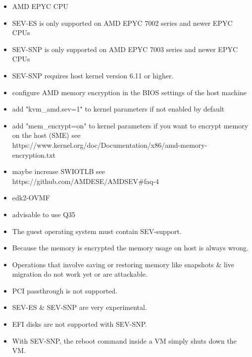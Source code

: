 \begin{itemize}[leftmargin=2cm]

	\item AMD EPYC CPU

	\item SEV-ES is only supported on AMD EPYC 7002 series and newer EPYC CPUs

	\item SEV-SNP is only supported on AMD EPYC 7003 series and newer EPYC CPUs

	\item SEV-SNP requires host kernel version 6.11 or higher.

	\item configure AMD memory encryption in the BIOS settings of the host machine

	\item add "kvm_amd.sev=1" to kernel parameters if not enabled by default

	\item add "mem_encrypt=on" to kernel parameters if you want to encrypt memory on the host (SME) see https://www.kernel.org/doc/Documentation/x86/amd-memory-encryption.txt

	\item maybe increase SWIOTLB see https://github.com/AMDESE/AMDSEV#faq-4

\end{itemize}

\begin{itemize}[leftmargin=2cm]

	\item edk2-OVMF

	\item advisable to use Q35

	\item The guest operating system must contain SEV-support.

\end{itemize}

\begin{itemize}[leftmargin=2cm]

	\item Because the memory is encrypted the memory usage on host is always wrong.

	\item Operations that involve saving or restoring memory like snapshots & live migration do not work yet or are attackable.

	\item PCI passthrough is not supported.

	\item SEV-ES & SEV-SNP are very experimental.

	\item EFI disks are not supported with SEV-SNP.

	\item With SEV-SNP, the reboot command inside a VM simply shuts down the VM.

\end{itemize}

